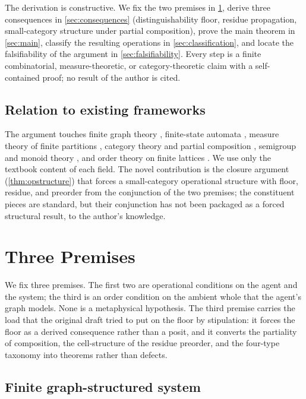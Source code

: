 \documentclass[11pt,a4paper]{article}
\theoremstyle{thmstyle}
\theoremstyle{definition}
\theoremstyle{remark}
\begin{document}
The derivation is constructive. We fix the two premises in
\cref{sec:premises}, derive three consequences in
\cref{sec:consequences} (distinguishability floor, residue
propagation, small-category structure under partial composition),
prove the main theorem in \cref{sec:main}, classify the resulting
operations in \cref{sec:classification}, and locate the
falsifiability of the argument in \cref{sec:falsifiability}. Every
step is a finite combinatorial, measure-theoretic, or
category-theoretic claim with a self-contained proof; no result of
the author is cited.

\subsection{Relation to existing frameworks}

The argument touches finite graph theory \citep{diestel2017,
bollobas1998}, finite-state automata \citep{hopcroft2007}, measure
theory of finite partitions \citep{halmos1950}, category theory and
partial composition \citep{maclane1998}, semigroup and monoid theory
\citep{howie1995}, and order theory on finite lattices
\citep{daveypriestley2002}. We use only the textbook content of
each field. The novel contribution is the closure argument
(\cref{thm:opstructure}) that forces a small-category operational
structure with floor, residue, and preorder from the conjunction of
the two premises; the constituent pieces are standard, but their
conjunction has not been packaged as a forced structural result, to
the author's knowledge.

\section{Three Premises}
\label{sec:premises}

We fix three premises. The first two are operational conditions on
the agent and the system; the third is an order condition on the
ambient whole that the agent's graph models. None is a metaphysical
hypothesis. The third premise carries the load that the original
draft tried to put on the floor by stipulation: it forces the floor
as a derived consequence rather than a posit, and it converts the
partiality of composition, the cell-structure of the residue
preorder, and the four-type taxonomy into theorems rather than
defects.

\subsection{Finite graph-structured system}
\end{document}
